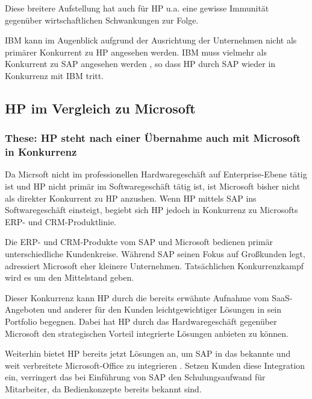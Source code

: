 \documentclass[a4paper,10pt,left=1.5cm,right=1.5cm,top=1.5cm,bottom=1.5cm]{article}
\begin{document}
Diese breitere Aufstellung hat auch für HP u.a. eine gewisse Immunität gegenüber wirtschaftlichen Schwankungen zur Folge.

IBM kann im Augenblick aufgrund der Ausrichtung der Unternehmen nicht als primärer Konkurrent zu HP angesehen werden.
IBM muss vielmehr als Konkurrent zu SAP angesehen werden \cite{ibmvssap}, so dass HP durch SAP wieder in Konkurrenz mit IBM tritt.

\subsection*{HP im Vergleich zu Microsoft}

\subsubsection*{These: HP steht nach einer Übernahme auch mit Microsoft in Konkurrenz}

Da Micrsoft nicht im professionellen Hardwaregeschäft auf Enterprise-Ebene tätig ist und HP nicht primär im Softwaregeschäft tätig ist, ist Microsoft bisher nicht als direkter Konkurrent zu HP anzushen.
Wenn HP mittels SAP ins Softwaregeschäft einsteigt, begiebt sich HP jedoch in Konkurrenz zu Microsofts ERP- und CRM-Produktlinie.

Die ERP- und CRM-Produkte vom SAP und Microsoft bedienen primär unterschiedliche Kundenkreise.
Während SAP seinen Fokus auf Großkunden legt, adressiert Microsoft eher kleinere Unternehmen.
Tatsächlichen Konkurrenzkampf wird es um den Mittelstand geben.

Dieser Konkurrenz kann HP durch die bereits erwähnte Aufnahme vom SaaS-Angeboten und anderer für den Kunden leichtgewichtiger Lösungen in sein Portfolio begegnen.
Dabei hat HP durch das Hardwaregeschäft gegenüber Microsoft den strategischen Vorteil integrierte Lösungen anbieten zu können.

Weiterhin bietet HP bereits jetzt Lösungen an, um SAP in das bekannte und weit verbreitete Microsoft-Office zu integrieren \cite{duet}.
Setzen Kunden diese Integration ein, verringert das bei Einführung von SAP den Schulungsaufwand für Mitarbeiter, da Bedienkonzepte bereits bekannt sind.





\end{document}
